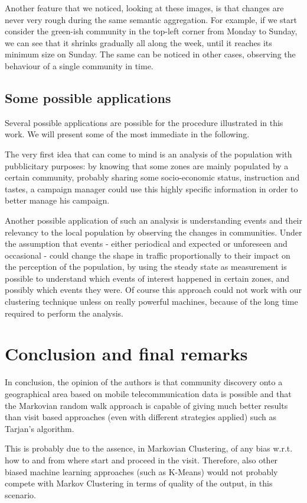 \documentclass[12pt,a4paper]{article}
\begin{document}
Another feature that we noticed, looking at these images, is that changes are never very rough during the same semantic aggregation.
For example, if we start consider the green-ish community in the top-left corner from Monday to Sunday, we can see that it shrinks gradually all along the week, until it reaches its minimum size on Sunday. The same can be noticed in other cases, observing the behaviour of a single community in time. 

\subsection{Some possible applications}
Several possible applications are possible for the procedure illustrated in this work. We will present some of the most immediate in the following.

The very first idea that can come to mind is an analysis of the population with pubblicitary purposes: by knowing that some zones are mainly populated by a certain community, probably sharing some socio-economic status, instruction and tastes, a campaign manager could use this highly specific information in order to better manage his campaign.

Another possible application of such an analysis is understanding events and their relevancy to the local population by observing the changes in communities. Under the assumption that events - either periodical and expected or unforeseen and occasional - could change the shape in traffic proportionally to their impact on the perception of the population, by using the steady state as measurement is possible to understand which events of interest happened in certain zones, and possibly which events they were.
Of course this approach could not work with our clustering technique unless on really powerful machines, because of the long time required to perform the analysis.
\newpage

\section{Conclusion and final remarks}

In conclusion, the opinion of the authors is that community discovery
onto a geographical area based on mobile telecommunication data
is possible and that the Markovian random walk approach is capable of giving much better
results than visit based approaches (even with different strategies applied) such as Tarjan's algorithm. 

This is probably due to the assence, in Markovian Clustering, of any bias w.r.t. how to and from where start
and proceed in the visit. Therefore, also other biased machine learning
approaches (such as K-Means) would not probably compete with Markov
Clustering in terms of quality of the output, in this scenario.
\end{document}
